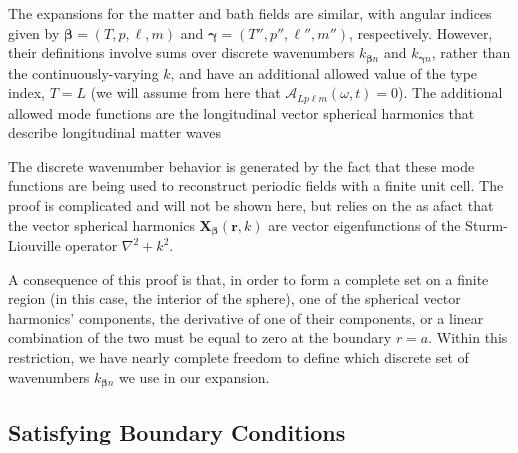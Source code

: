 \documentclass{article}
\begin{document}
The expansions for the matter and bath fields are similar, with angular indices given by $\bm{\beta} = (T,p,\ell,m)$ and $\bm{\gamma} = (T'',p'',\ell'',m'')$, respectively. However, their definitions involve sums over discrete wavenumbers $k_{\bm{\beta}n}$ and $k_{\bm{\gamma}n}$, rather than the continuously-varying $k$, and have an additional allowed value of the type index, $T = L$ (we will assume from here that $\mathcal{A}_{Lp\ell m}(\omega,t) = 0$). The additional allowed mode functions are the longitudinal vector spherical harmonics that describe longitudinal matter waves

The discrete wavenumber behavior is generated by the fact that these mode functions are being used to reconstruct periodic fields with a finite unit cell. The proof is complicated\cite{titchmarsh1946eigenfunction} and will not be shown here, but relies on the as afact that the vector spherical harmonics $\mathbf{X}_{\bm{\beta}}(\mathbf{r},k)$ are vector eigenfunctions of the Sturm-Liouville operator $\nabla^2 + k^2$. 

A consequence of this proof is that, in order to form a complete set on a finite region (in this case, the interior of the sphere), one of the spherical vector harmonics' components, the derivative of one of their components, or a linear combination of the two must be equal to zero at the boundary $r = a$. Within this restriction, we have nearly complete freedom to define which discrete set of wavenumbers $k_{\bm{\beta}n}$ we use in our expansion.






\subsection{Satisfying Boundary Conditions}
\end{document}
